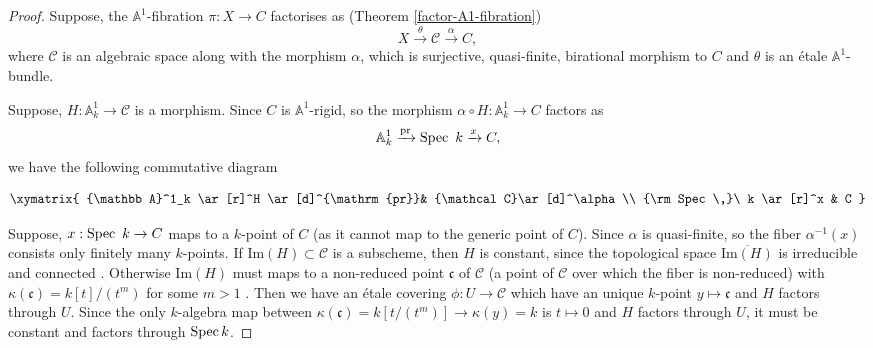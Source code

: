 \documentclass[11pt, reqno]{amsart}
\theoremstyle{plain}
\theoremstyle{definition}
\newcommand{\pr}{\mathrm{pr}}%
\newcommand{\Spec}{{\rm Spec \,}}
\renewcommand{\tilde}{\widetilde}
\newcommand{\sC}{{\mathcal C}}
\newcommand{\sO}{{\mathcal O}}
\newcommand{\A}{{\mathbb A}}
\begin{document}
		\begin{proof}
			Suppose, the $\A^1$-fibration $\pi: X \to C$ factorises as (Theorem \ref{factor-A1-fibration})
$$X \xrightarrow{\theta} \mathcal{C}\xrightarrow{\alpha} C,$$ 
where $\sC$ is an algebraic space along with the morphism $\alpha$, which is surjective, quasi-finite, birational morphism to $C$ and $\theta$ is an étale $\A^1$-bundle. 

Suppose, $H: \A^1_k \rightarrow \sC$ is a morphism. Since $C$ is $\mathbb{A}^1$-rigid, so the morphism $\alpha \circ H: \mathbb{A}^1_k \to C$  
factors as
$$\A^1_k \xrightarrow{\pr} \Spec\ k  \xrightarrow{x} C,$$
we have the following commutative diagram 

\[
\xymatrix{
\A^1_k \ar[r]^H \ar[d]^{\pr}& \sC \ar[d]^\alpha\\
\Spec\ k \ar[r]^x & C
}\]


              Suppose, $x: \Spec\ k \to C$ maps to a $k$-point of $C$ (as it cannot map to the generic point of $C$). Since $\alpha$ is quasi-finite, so the fiber $\alpha^{-1}(x)$ consists only finitely many $k$-points. If Im$(H)\subset \sC$ is a subscheme, then $H$ is constant, since the topological space $\overline{\text{Im}(H)}$ is irreducible and connected . Otherwise Im$(H)$ must maps to a non-reduced point $\mathfrak{c}$ of $\sC$ (a point of $\sC$ over which the fiber is non-reduced) with $\kappa(\mathfrak{c})=k[t]/(t^m)$ for some $m>1$ . Then we have an étale covering $\phi: U \to \sC$ which have an unique $k$-point $y\mapsto \mathfrak{c}$ and $H$ factors through $U$. Since the only $k$-algebra map between $\kappa(\mathfrak{c})=k[t/(t^m)]\to \kappa(y)=k$ is $t\mapsto 0$ and $H$ factors through $U$, it must be constant and factors through $\Spec k$. 


\end{proof}
\end{document}
